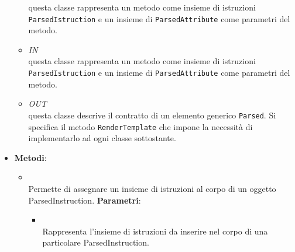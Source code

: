 \begin{itemize}
\begin{itemize}
questa classe rappresenta un metodo come insieme di istruzioni \texttt{ParsedIstruction} e un insieme di \texttt{ParsedAttribute} come parametri del metodo.
\item \textit{IN} \hyperref[\nogloxy{swedesigner::server::project::ParsedMethod}]{}\\
questa classe rappresenta un metodo come insieme di istruzioni \texttt{ParsedIstruction} e un insieme di \texttt{ParsedAttribute} come parametri del metodo.
\item \textit{OUT} \hyperref[\nogloxy{swedesigner::server::project::ParsedElement}]{}\\
questa classe descrive il contratto di un elemento generico \texttt{Parsed}. Si specifica il metodo \texttt{RenderTemplate} che impone la necessità di implementarlo ad ogni classe sottostante.
\end{itemize}
\item \textbf{Metodi}:
\begin{itemize}
\item {}
\\ Permette di assegnare un insieme di istruzioni al corpo di un oggetto ParsedInstruction.
\textbf{Parametri}:
\begin{itemize}
\item {}
\\ Rappresenta l'insieme di istruzioni da inserire nel corpo di una particolare ParsedInstruction.
\end{itemize}
\end{itemize}
\end{itemize}

